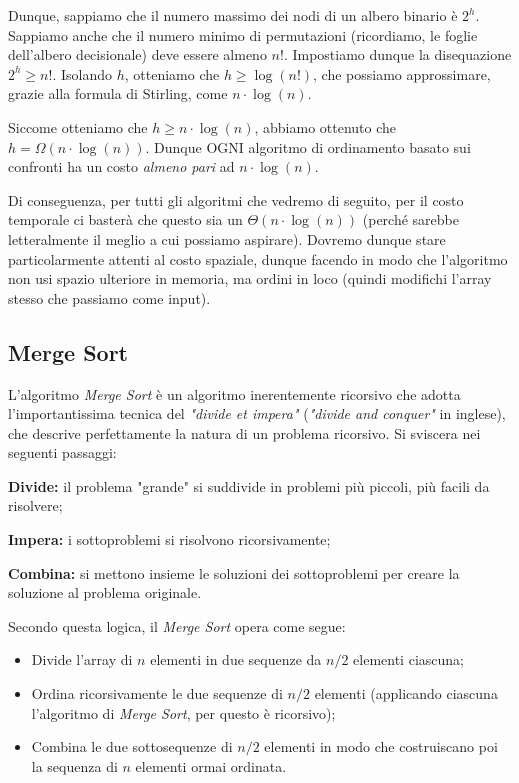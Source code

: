 \documentclass[12pt]{report}
\begin{document}
    Dunque, sappiamo che il numero massimo dei nodi di un albero binario è $2^h$. Sappiamo anche che il numero minimo di permutazioni (ricordiamo, le foglie dell’albero decisionale) deve essere almeno $n!$.
    Impostiamo dunque la disequazione $2^h \geq n!$. Isolando $h$, otteniamo che $h \geq \log(n!)$, che possiamo approssimare, grazie alla formula di Stirling, come $n\cdot \log(n)$.
    
    Siccome otteniamo che $h \geq n\cdot \log(n)$, abbiamo ottenuto che $h = \Omega(n\cdot \log(n))$.
    Dunque OGNI algoritmo di ordinamento basato sui confronti ha un costo \textit{almeno pari }ad $n\cdot \log(n)$.
    
    Di conseguenza, per tutti gli algoritmi che vedremo di seguito, per il costo temporale ci basterà che questo sia un $\Theta(n\cdot \log(n))$ (perché sarebbe letteralmente il meglio a cui possiamo aspirare). Dovremo dunque stare particolarmente attenti al costo spaziale, dunque facendo in modo che l’algoritmo non usi spazio ulteriore in memoria, ma ordini in loco (quindi modifichi l’array stesso che passiamo come input).
    
    \subsection{Merge Sort}
    L'algoritmo \textit{Merge Sort} è un algoritmo inerentemente ricorsivo che adotta l'importantissima tecnica del \textit{"divide et impera"} (\textit{"divide and conquer"} in inglese), che descrive perfettamente la natura di un problema ricorsivo. Si sviscera nei seguenti passaggi:
    
    \begin{description}
    	\item \textbf{Divide:} il problema "grande" si suddivide in problemi più piccoli, più facili da risolvere;
    	\item \textbf{Impera:} i sottoproblemi si risolvono ricorsivamente;
    	\item \textbf{Combina:} si mettono insieme le soluzioni dei sottoproblemi per creare la soluzione al problema originale.
    \end{description}
    
    Secondo questa logica, il \textit{Merge Sort} opera come segue:
    \begin{itemize}
    	\item Divide l'array di $n$ elementi in due sequenze da $n/2$ elementi ciascuna;
    	\item Ordina ricorsivamente le due sequenze di $n/2$ elementi (applicando ciascuna l'algoritmo di \textit{Merge Sort}, per questo è ricorsivo);
    	\item Combina le due sottosequenze di $n/2$ elementi in modo che costruiscano poi la sequenza di $n$ elementi ormai ordinata.
    \end{itemize}
    		
\end{document}
